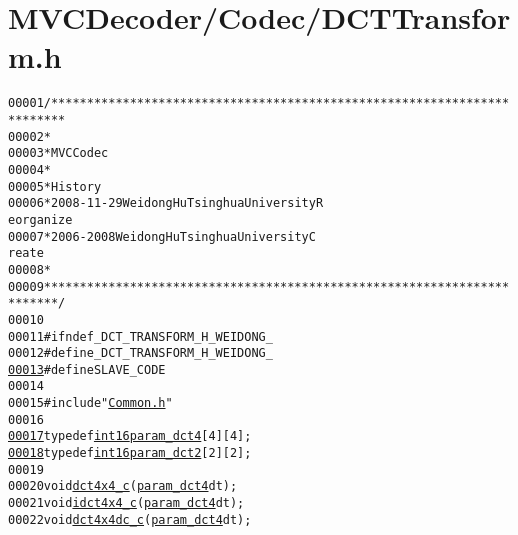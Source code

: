 \hypertarget{_d_c_t_transform_8h_source}{
\section{MVCDecoder/Codec/DCTTransform.h}
}


\begin{footnotesize}\begin{alltt}
00001 \textcolor{comment}{/************************************************************************}
00002 \textcolor{comment}{ *}
00003 \textcolor{comment}{ * MVC Codec}
00004 \textcolor{comment}{ * }
00005 \textcolor{comment}{ * History}
00006 \textcolor{comment}{ * 2008-11-29           Weidong Hu              Tsinghua University             R
      eorganize}
00007 \textcolor{comment}{ * 2006-2008            Weidong Hu              Tsinghua University             C
      reate}
00008 \textcolor{comment}{ * }
00009 \textcolor{comment}{ ************************************************************************/}
00010 
00011 \textcolor{preprocessor}{#ifndef \_DCT\_TRANSFORM\_H\_WEIDONG\_}
00012 \textcolor{preprocessor}{}\textcolor{preprocessor}{#define \_DCT\_TRANSFORM\_H\_WEIDONG\_}
\hypertarget{_d_c_t_transform_8h_source_l00013}{}\hyperlink{_d_c_t_transform_8h_a995f6a4907273b8d56b6543ab1a57d17}{00013} \textcolor{preprocessor}{}\textcolor{preprocessor}{#define SLAVE\_CODE}
00014 \textcolor{preprocessor}{}
00015 \textcolor{preprocessor}{#include "\hyperlink{_common_8h}{Common.h}"}
00016 
\hypertarget{_d_c_t_transform_8h_source_l00017}{}\hyperlink{_d_c_t_transform_8h_adee5aa91ada08f440eadac1fa5dea16f}{00017} \textcolor{keyword}{typedef} \hyperlink{_types_8h_a259fa4834387bd68627ddf37bb3ebdb9}{int16} \hyperlink{_d_c_t_transform_8h_adee5aa91ada08f440eadac1fa5dea16f}{param_dct4}[4][4];
\hypertarget{_d_c_t_transform_8h_source_l00018}{}\hyperlink{_d_c_t_transform_8h_abace759df68d8f1dcf808ffac7ed39c8}{00018} \textcolor{keyword}{typedef} \hyperlink{_types_8h_a259fa4834387bd68627ddf37bb3ebdb9}{int16} \hyperlink{_d_c_t_transform_8h_abace759df68d8f1dcf808ffac7ed39c8}{param_dct2}[2][2];
00019 
00020 \textcolor{keywordtype}{void} \hyperlink{_d_c_t_transform_8cpp_a4537742f3b23a0045b91421a77697cf0}{dct4x4_c}(\hyperlink{_d_c_t_transform_8h_adee5aa91ada08f440eadac1fa5dea16f}{param_dct4} dt);
00021 \textcolor{keywordtype}{void} \hyperlink{_d_c_t_transform_8cpp_a923ec91bf45c73e8baaf4e1bbad9a289}{idct4x4_c}(\hyperlink{_d_c_t_transform_8h_adee5aa91ada08f440eadac1fa5dea16f}{param_dct4} dt);
00022 \textcolor{keywordtype}{void} \hyperlink{_d_c_t_transform_8cpp_a7f5a0183a4c6fe784347f8b4d0005db1}{dct4x4dc_c}(\hyperlink{_d_c_t_transform_8h_adee5aa91ada08f440eadac1fa5dea16f}{param_dct4} dt);

\end{alltt}
\end{footnotesize}
